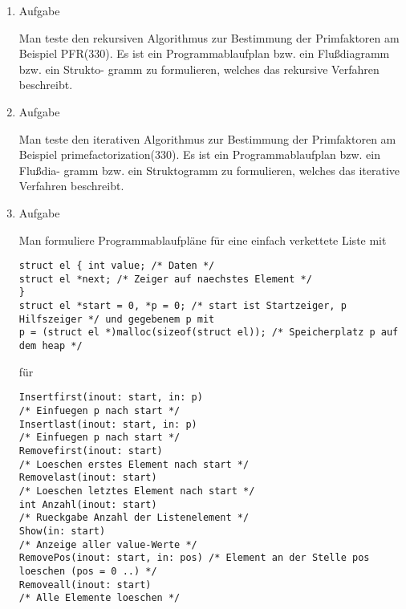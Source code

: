 \documentclass[12pt,a4paper]{scrreprt}
\begin{document}
\begin{enumerate}
(b) Formulieren Sie einen Programmablaufplan bzw. ein Flußdiagramm bzw. ein Struktogramm, welches das Siebverfahren von Eratosthenes bis n (n > 0) realisiert.

    solange i<n
      j = wähle nöchste zahl aus ungestrichenen zahlen
      solange j<n
        streiche vielfache von j

(c) Führen Sie das optimierte Verfahren, \href{run:Algorithmen_Heron_Euklid_Prim.pdf}{Algorithmen}, S. 11, Vorlesung 4 manuell auf Papier für die natürlichen Zahlen von 1 bis 60 durch.

(d) Formulieren Sie einen Programmablaufplan bzw. ein Flußdiagramm bzw. ein Struktogramm, welches das optimierte Verfahren bis n (n > 0) realisiert.

(e) optional: Schreiben Sie ein C-Programm zum Sieb- und zum optimierten Verfahren

\item Aufgabe %

Man teste den rekursiven Algorithmus zur Bestimmung der Primfaktoren am
Beispiel PFR(330). Es ist ein Programmablaufplan bzw. ein Flußdiagramm bzw. ein Strukto-
gramm zu formulieren, welches das rekursive Verfahren beschreibt.

\item Aufgabe %

Man teste den iterativen Algorithmus zur Bestimmung der Primfaktoren am
Beispiel primefactorization(330). Es ist ein Programmablaufplan bzw. ein Flußdia-
gramm bzw. ein Struktogramm zu formulieren, welches das iterative Verfahren beschreibt.

\item Aufgabe %

Man formuliere Programmablaufpläne für eine einfach verkettete Liste mit

\begin{lstlisting}
struct el { int value; /* Daten */
struct el *next; /* Zeiger auf naechstes Element */
}
struct el *start = 0, *p = 0; /* start ist Startzeiger, p Hilfszeiger */ und gegebenem p mit
p = (struct el *)malloc(sizeof(struct el)); /* Speicherplatz p auf dem heap */
\end{lstlisting}

für

\begin{lstlisting}
Insertfirst(inout: start, in: p)
/* Einfuegen p nach start */
Insertlast(inout: start, in: p)
/* Einfuegen p nach start */
Removefirst(inout: start)
/* Loeschen erstes Element nach start */
Removelast(inout: start)
/* Loeschen letztes Element nach start */
int Anzahl(inout: start)
/* Rueckgabe Anzahl der Listenelement */
Show(in: start)
/* Anzeige aller value-Werte */
RemovePos(inout: start, in: pos) /* Element an der Stelle pos loeschen (pos = 0 ..) */
Removeall(inout: start)
/* Alle Elemente loeschen */
\end{lstlisting}


\end{enumerate}
\end{document}

